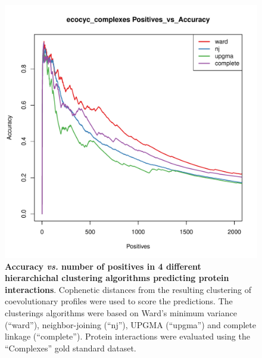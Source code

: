 \begin{figure}[htbp]
\centering
\includegraphics[keepaspectratio,width=\textwidth,height=0.75\textheight]{../figures/mtclustering_methods.pdf}
	\caption{\textbf{Accuracy \emph{vs.} number of positives in 4 different hierarchichal clustering algorithms predicting protein interactions}. Cophenetic distances from the resulting clustering of coevolutionary profiles were used to score the predictions. The clusterings algorithms were based on Ward's minimum variance (``ward''), neighbor-joining (``nj''), UPGMA (``upgma'') and complete linkage (``complete''). Protein interactions were evaluated using the ``Complexes'' gold standard dataset.}
\label{mtclustering_methods.pdf}
\end{figure}